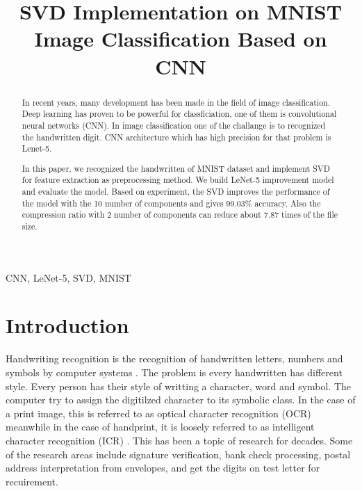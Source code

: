 \documentclass[conference]{IEEEtran}
\begin{document}
\title{SVD Implementation on MNIST Image Classification Based on CNN\\
}

\author{
}

\maketitle

\begin{abstract}
In recent years, many development has been made in the field of image classification. Deep learning has proven to be powerful for classficiation, one of them is convolutional neural networks (CNN). 
In image classification one of the challange is to recognized the handwritten digit. 
CNN architecture which has high precision for that problem is Lenet-5.

In this paper, we recognized the handwritten of MNIST dataset and implement SVD for feature extraction as preprocessing method. 
We build LeNet-5 improvement model and evaluate the model. Based on experiment, the SVD
improves the performance of the model with the 10 number
of components and gives 99.03\% accuracy. Also the compression
ratio with 2 number of components can reduce about 7.87
times of the file size.
\end{abstract}

\begin{IEEEkeywords}
CNN, LeNet-5, SVD, MNIST
\end{IEEEkeywords}

\section{Introduction}
Handwriting recognition is the recognition of handwritten letters, numbers and symbols by computer systems \cite{maad2015}.
The problem is every handwritten has different style. 
Every person has their style of writting a character, word and symbol. 
The computer try to assign the digitilzed character to its symbolic class. 
In the case of a print image, this is referred to as optical character recognition (OCR) 
meanwhile in the case of handprint, it is loosely referred to as intelligent character recognition (ICR) \cite{824821}.
This has been a topic of research for decades. 
Some of the research areas include signature verification, bank check processing, postal address interpretation from envelopes, and get the digits on test letter for recuirement.
\end{document}
